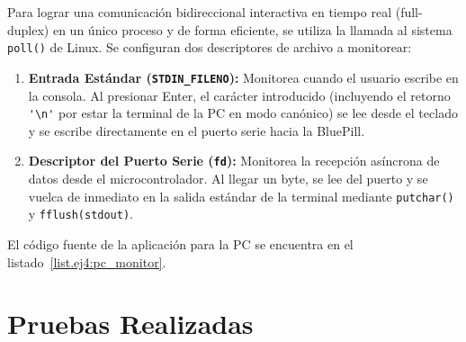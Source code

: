 Para lograr una comunicación bidireccional interactiva en tiempo real (full-duplex) en un único proceso y de forma
eficiente, se utiliza la llamada al sistema \lstinline{poll()} de Linux. Se configuran dos descriptores de archivo
a monitorear:
\begin{enumerate}
  \item \textbf{Entrada Estándar (\texttt{STDIN\_FILENO}):} Monitorea cuando el usuario escribe en la consola. Al
        presionar Enter, el carácter introducido (incluyendo el retorno \lstinline{'\n'} por estar la terminal de la PC en
        modo canónico) se lee desde el teclado y se escribe directamente en el puerto serie hacia la BluePill.
  \item \textbf{Descriptor del Puerto Serie (\texttt{fd}):} Monitorea la recepción asíncrona de datos desde el
        microcontrolador. Al llegar un byte, se lee del puerto y se vuelca de inmediato en la salida estándar de
        la terminal mediante \lstinline{putchar()} y \lstinline{fflush(stdout)}.
\end{enumerate}

El código fuente de la aplicación para la PC se encuentra en el listado~\ref{list.ej4:pc_monitor}.

\section{Pruebas Realizadas}

